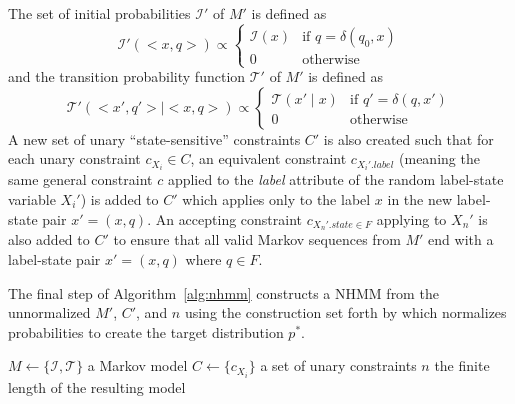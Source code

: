 \documentclass[phd,electronic,oneside,twosidetoc,letterpaper,chaptercenter,parttop,lof,lot]{byumsphd}
\begin{document}
The set of initial probabilities $\mathcal{I}'$ of $M'$ is defined as
\[
  \mathcal{I}'(<x,q>) \propto
  \begin{cases}
	\mathcal{I}(x) & \text{if } q = \delta(q_0,x)\\
	0 & \text{otherwise}
  \end{cases}
\]
\noindent and the transition probability function $\mathcal{T}'$ of $M'$ is defined as
\[
  \mathcal{T}'(<x',q'>\mid <x,q>) \propto   
  \begin{cases}
	\mathcal{T}(x'\mid x) & \text{if } q'=\delta(q,x')\\
	0 & \text{otherwise}
  \end{cases}
\]
A new set of unary ``state-sensitive'' constraints $C'$ is also created such that for each unary constraint $c_{X_i} \in C$, an equivalent constraint $c_{X_i'.label}$ (meaning the same general constraint $c$ applied to the \textit{label} attribute of the random label-state variable $X_i'$) is added to $C'$ which applies only to the label $x$ in the new label-state pair $x'=(x,q)$. An {\sc accepting} constraint $c_{X_n'.state\in F}$ applying to $X_n'$ is also added to $C'$ to ensure that all valid Markov sequences from $M'$ end with a label-state pair $x'=(x,q)$ where $q\in F$.

The final step of Algorithm~\ref{alg:nhmm} constructs a NHMM from the unnormalized $M'$, $C'$, and $n$ using the construction set forth by \citeauthor{pachet2011finite} \cite{pachet2011finite} which normalizes probabilities to create the target distribution $p^*$.

\newcommand{\gbfsa}{\ensuremath{\mbox{\sc Regular NHMM}}}
\renewcommand{\algorithmicrequire}{\textbf{Data:}}
\renewcommand{\algorithmicensure}{\textbf{Result:}}
\begin{algorithm}
\caption{$\gbfsa$}\label{alg:nhmm} 
\begin{algorithmic}
{}\newline
$M \leftarrow \{\mathcal{I},\mathcal{T}\}$ a Markov model \newline
$C \leftarrow \{c_{X_i}\}$ a set of unary constraints \newline
$n$ the finite length of the resulting model
 \newline
{} 
	 
\EndFor
	 
	\EndFor
\EndFor
{} 
\EndFor
{}
\end{algorithmic}
\end{algorithm}
\end{document}
